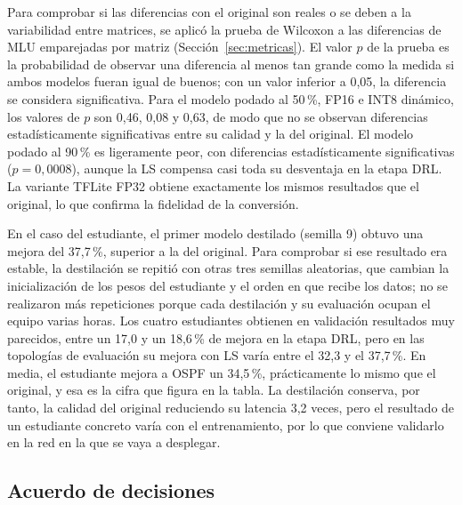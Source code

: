 Para comprobar si las diferencias con el original son reales o se deben a la variabilidad entre matrices, se aplicó la prueba de Wilcoxon a las diferencias de MLU emparejadas por matriz (Sección~\ref{sec:metricas}). El valor $p$ de la prueba es la probabilidad de observar una diferencia al menos tan grande como la medida si ambos modelos fueran igual de buenos; con un valor inferior a 0,05, la diferencia se considera significativa. Para el modelo podado al 50\,\%, FP16 e INT8 dinámico, los valores de $p$ son 0,46, 0,08 y 0,63, de modo que no se observan diferencias estadísticamente significativas entre su calidad y la del original. El modelo podado al 90\,\% es ligeramente peor, con diferencias estadísticamente significativas ($p = 0{,}0008$), aunque la LS compensa casi toda su desventaja en la etapa DRL. La variante TFLite FP32 obtiene exactamente los mismos resultados que el original, lo que confirma la fidelidad de la conversión.\label{sec:res_semillas}

En el caso del estudiante, el primer modelo destilado (semilla 9) obtuvo una mejora del 37,7\,\%, superior a la del original. Para comprobar si ese resultado era estable, la destilación se repitió con otras tres semillas aleatorias, que cambian la inicialización de los pesos del estudiante y el orden en que recibe los datos; no se realizaron más repeticiones porque cada destilación y su evaluación ocupan el equipo varias horas. Los cuatro estudiantes obtienen en validación resultados muy parecidos, entre un 17,0 y un 18,6\,\% de mejora en la etapa DRL, pero en las topologías de evaluación su mejora con LS varía entre el 32,3 y el 37,7\,\%. En media, el estudiante mejora a OSPF un 34,5\,\%, prácticamente lo mismo que el original, y esa es la cifra que figura en la tabla. La destilación conserva, por tanto, la calidad del original reduciendo su latencia 3,2 veces, pero el resultado de un estudiante concreto varía con el entrenamiento, por lo que conviene validarlo en la red en la que se vaya a desplegar.

\subsection{Acuerdo de decisiones}

